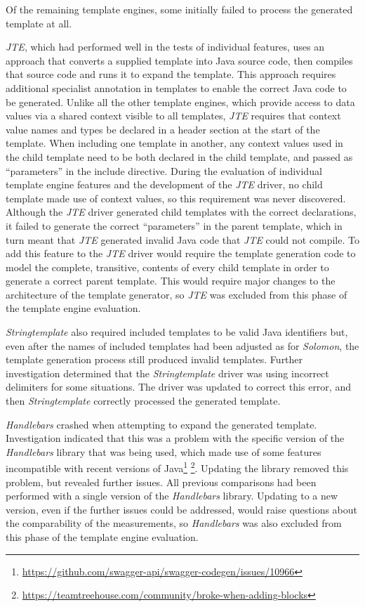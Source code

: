 Of the remaining \gls{template engine}s, some initially  failed to process the generated template at all.

\emph{JTE}, which had performed well in the tests of individual features, uses an approach that converts a supplied template into Java source code, then compiles that source code and runs it to expand the template. This approach requires additional specialist annotation in templates to enable the correct Java code to be generated. Unlike all the other \gls{template engine}s, which provide access to data values via a shared context visible to all templates, \emph{JTE} requires that context value names and types be declared in a header section at the start of the template. When including one template in another, any context values used in the child template need to be both declared in the child template, and passed as \enquote{parameters} in the include directive. During the evaluation of individual \gls{template engine} features and the development of the \emph{JTE} driver, no child template made use of context values, so this requirement was never discovered. Although the \emph{JTE} driver generated child templates with the correct declarations, it failed to generate the correct \enquote{parameters} in the parent template, which in turn meant that \emph{JTE} generated invalid Java code that \emph{JTE} could not compile. To add this feature to the \emph{JTE} driver would require the template generation code to model the complete, transitive, contents of every child template in order to generate a correct parent template. This would require major changes to the architecture of the template generator, so \emph{JTE} was excluded from this phase of the \gls{template engine} evaluation.

\emph{Stringtemplate} also required included templates to be valid Java identifiers but, even after the names of included templates had been adjusted as for \emph{Solomon}, the template generation process still produced invalid templates. Further investigation determined that the \emph{Stringtemplate} driver was using incorrect delimiters for some situations. The driver was updated to correct this error, and then \emph{Stringtemplate} correctly processed the generated template.

\emph{Handlebars} crashed when attempting to expand the generated template. Investigation indicated that this was a problem with the specific version of the \emph{Handlebars} library that was being used, which made use of some features incompatible with recent versions of Java\footnote{\url{https://github.com/swagger-api/swagger-codegen/issues/10966}} \footnote{\url{https://teamtreehouse.com/community/broke-when-adding-blocks}}. Updating the library removed this problem, but revealed further issues. All previous comparisons had been performed with a single version of the \emph{Handlebars} library. Updating to a new version, even if the further issues could be addressed, would raise questions about the comparability of the measurements, so \emph{Handlebars} was also excluded from this phase of the \gls{template engine} evaluation.

